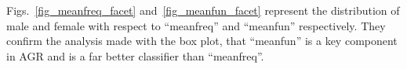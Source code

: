 Figs.~\ref{fig_meanfreq_facet} and~\ref{fig_meanfun_facet} represent the distribution of male and female with respect to ``meanfreq'' and ``meanfun'' respectively. They confirm the analysis made with the box plot, \ie{} that ``meanfun'' is a key component in AGR and is a far better classifier than ``meanfreq''.
